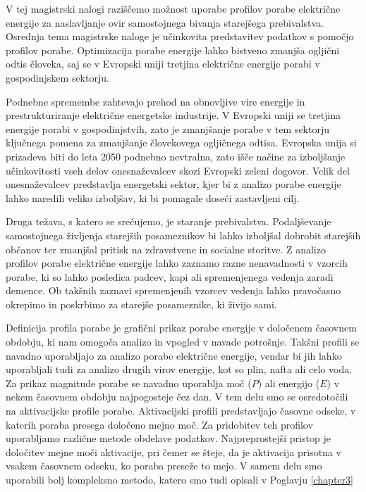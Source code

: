 \begin{sloabstract}
V tej magistrski nalogi raziščemo možnost uporabe profilov porabe električne energije za naslavljanje ovir samostojnega bivanja starejšega prebivalstva. Osrednja tema magistrske naloge je učinkovita predstavitev podatkov s pomočjo profilov porabe. Optimizacija porabe energije lahko bistveno zmanjša ogljični odtis človeka, saj se v Evropski uniji tretjina električne energije porabi v gospodinjskem sektorju. 

Podnebne spremembe zahtevajo prehod na obnovljive vire energije in prestrukturiranje električne energetske industrije. V Evropski uniji se tretjina energije porabi v gospodinjstvih, zato je zmanjšanje porabe v tem sektorju ključnega pomena za zmanjšanje človekovega ogljičnega odtisa. Evropska unija si prizadeva biti do leta 2050 podnebno nevtralna, zato išče načine za izboljšanje učinkovitosti vseh delov onesnaževalcev skozi Evropski zeleni dogovor. Velik del onesnaževalcev predstavlja energetski sektor, kjer bi z analizo porabe energije lahko naredili veliko izboljšav, ki bi pomagale doseči zastavljeni cilj. 

Druga težava, s katero se srečujemo, je staranje prebivalstva. Podaljševanje samostojnega življenja starejših posameznikov bi lahko izboljšal dobrobit starejših občanov ter zmanjšal pritisk na zdravstvene in socialne storitve. Z analizo profilov porabe električne energije lahko zaznamo razne nenavadnosti v vzorcih porabe, ki so lahko posledica padcev, kapi ali spremenjenega vedenja zaradi demence. Ob takšnih zaznavi spremenjenih vzorcev vedenja lahko pravočasno okrepimo in poskrbimo za starejše posameznike, ki živijo sami.  

Definicija profila porabe je grafični prikaz porabe energije v določenem časovnem obdobju, ki nam omogoča analizo in vpogled v navade potrošnje. Takšni profili se navadno uporabljajo za analizo porabe električne energije, vendar bi jih lahko uporabljali tudi za analizo drugih virov energije, kot so plin, nafta ali celo voda. Za prikaz magnitude porabe se navadno uporablja moč ($P$) ali energijo ($E$) v nekem časovnem obdobju najpogosteje čez dan. V tem delu smo se osredotočili na aktivacijske profile porabe. Aktivacijski profili predstavljajo časovne odseke, v katerih poraba presega določeno mejno moč. Za pridobitev teh profilov uporabljamo različne metode obdelave podatkov. Najpreprostejši pristop je določitev mejne moči aktivacije, pri čemer se šteje, da je aktivacija prisotna v vsakem časovnem odseku, ko poraba preseže to mejo. V samem delu smo uporabili bolj kompleksno metodo, katero smo tudi opisali v Poglavju \ref{chapter3}  


\end{sloabstract}
